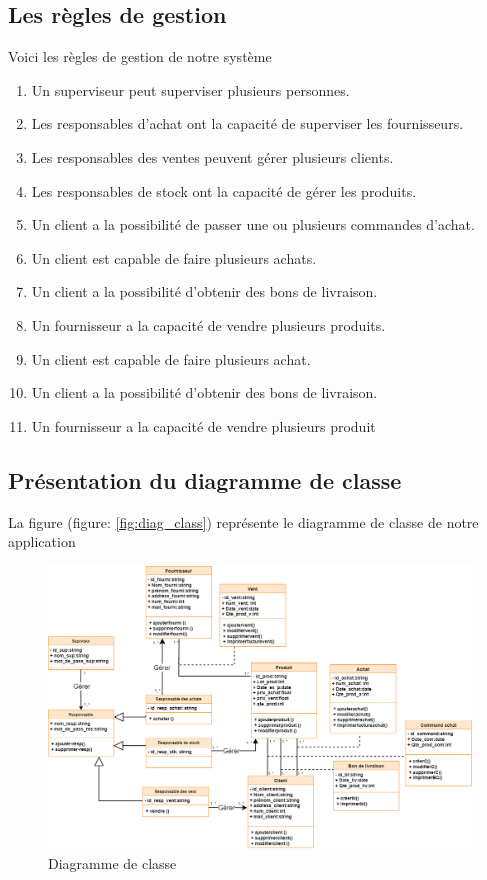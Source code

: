 \documentclass[edit,12pt,a4paper,ChapStyle,oneside,doubleinterligne]{report}
\begin{document}
\subsection{Les règles de gestion}
Voici les règles de gestion de notre système 
\begin{enumerate}
    \item Un superviseur peut superviser plusieurs personnes.
    \item Les responsables d’achat ont la capacité de superviser les fournisseurs.
    \item Les responsables des ventes peuvent gérer plusieurs clients.
    \item Les responsables de stock ont la capacité de gérer les produits.
    \item Un client a la possibilité de passer une ou plusieurs commandes d'achat.
    \item Un client est capable de faire plusieurs achats.
    \item Un client a la possibilité d'obtenir des bons de livraison.
    \item Un fournisseur a la capacité de vendre plusieurs produits.
    \item Un client est capable de faire plusieurs achat.
    \item Un client a la possibilité d'obtenir des bons de livraison.
    \item Un fournisseur a la capacité de vendre plusieurs produit
\end{enumerate}
\clearpage
\subsection{Présentation du diagramme de classe}
La figure (figure: \ref{fig:diag_class}) représente le diagramme de classe de notre application 
\begin{figure}[h!]\label{fig:diag_classl}
\centering
\includegraphics[width=1\textwidth]{images/diagramme de class L.png}
\caption{Diagramme de classe}
\end{figure}
\end{document}
